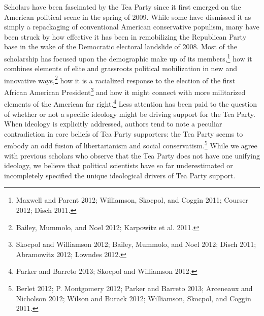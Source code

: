 \documentclass[12pt,]{article}
\begin{document}
Scholars have been fascinated by the Tea Party since it first emerged on
the American political scene in the spring of 2009. While some have
dismissed it as simply a repackaging of conventional American
conservative populism, many have been struck by how effective it has
been in remobilizing the Republican Party base in the wake of the
Democratic electoral landslide of 2008. Most of the scholarship has
focused upon the demographic make up of its members,\footnote{Maxwell
  and Parent 2012; Williamson, Skocpol, and Coggin 2011; Courser 2012;
  Disch 2011. } how it combines elements of elite and grassroots
political mobilization in new and innovative ways,\footnote{Bailey,
  Mummolo, and Noel 2012; Karpowitz et al. 2011. } how it is a
racialized response to the election of the first African American
President\footnote{Skocpol and Williamson 2012; Bailey, Mummolo, and
  Noel 2012; Disch 2011; Abramowitz 2012; Lowndes 2012. } and how it
might connect with more militarized elements of the American far
right.\footnote{Parker and Barreto 2013; Skocpol and Williamson 2012. }
Less attention has been paid to the question of whether or not a
specific ideology might be driving support for the Tea Party. When
ideology is explicitly addressed, authors tend to note a peculiar
contradiction in core beliefs of Tea Party supporters: the Tea Party
seems to embody an odd fusion of libertarianism and social
conservatism.\footnote{Berlet 2012; P. Montgomery 2012; Parker and
  Barreto 2013; Arceneaux and Nicholson 2012; Wilson and Burack 2012;
  Williamson, Skocpol, and Coggin 2011. } While we agree with previous
scholars who observe that the Tea Party does not have one unifying
ideology, we believe that political scientists have so far
underestimated or incompletely specified the unique ideological drivers
of Tea Party support.
\end{document}
